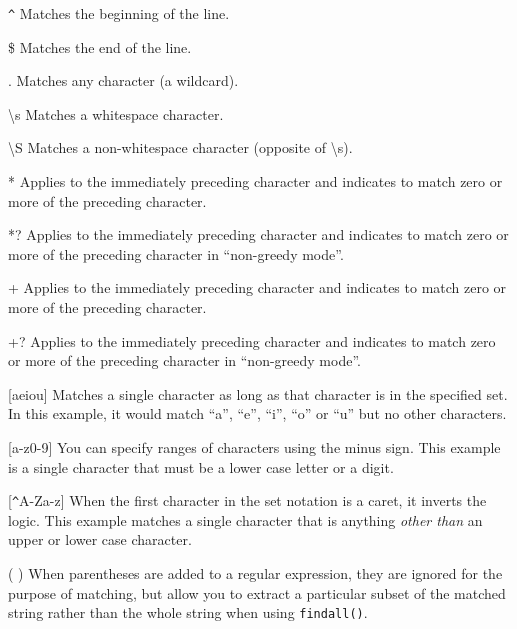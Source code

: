 \verb"^" \newline
Matches the beginning of the line.

\$ \newline
Matches the end of the line.

. \newline
Matches any character (a wildcard).

{\textbackslash}s \newline
Matches a whitespace character.

{\textbackslash}S \newline
Matches a non-whitespace character (opposite of {\textbackslash}s).

* \newline
Applies to the immediately preceding character and indicates to match zero or more of the preceding character.

*? \newline
Applies to the immediately preceding character and indicates to match zero or more of the preceding character in ``non-greedy mode''.

+ \newline
Applies to the immediately preceding character and indicates to match zero or more of the preceding character.

+? \newline
Applies to the immediately preceding character and indicates to match zero or more of the preceding character in ``non-greedy mode''.

[aeiou] \newline
Matches a single character as long as that character is in the specified set.  In this example, it would match ``a'', ``e'', ``i'', ``o'' or ``u'' but no other characters.

[a-z0-9] \newline
You can specify ranges of characters using the minus sign.  This example is a single character that must be a lower case letter or a digit.

[\verb"^"A-Za-z] \newline
When the first character in the set notation is a caret, it inverts the logic.  This example matches a single character that is anything {\em other than} an upper or lower case character.

( ) \newline
When parentheses are added to a regular expression, they are ignored for the purpose of matching, but allow you to extract a particular subset of the matched string rather than the whole string when using {\tt findall()}.

